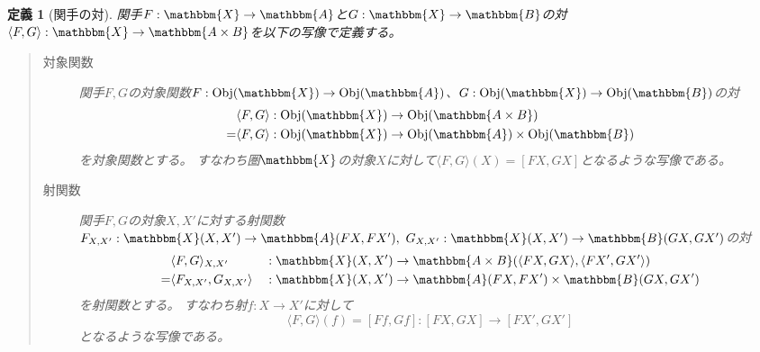 \documentclass[dvipdfmx]{jsarticle}
\newcommand{\cat}[1]{\mathbbm{#1}}
\newcommand{\arrow}{\rightarrow}
\newcommand{\functor}[3]{#1:\cat{#2}\arrow \cat{#3}}
\newcommand{\tuple}[1]{\langle #1\rangle}
\newcommand{\obj}[1]{\mathrm{Obj}(\cat{#1})}
\newcommand{\mor}[3]{#1:#2\arrow #3}
\newcommand{\arset}[3]{\cat{#1}(#2,#3)}
\newcommand{\pcobj}[1]{[#1]}
\newtheorem{define}{定義}[section]
\numberwithin{proof}{subsection}
\numberwithin{prop}{subsection}
\numberwithin{define}{subsection}
\begin{document}
	\begin{define}[関手の対]
		関手$\functor{F}{X}{A}$と$\functor{G}{X}{B}$の対$\functor{\tuple{F,G}}{X}{A\times B}$を以下の写像で定義する。
		\begin{quote}
			\begin{description}
				\item[対象関数] 関手$F,G$の対象関数$\mor{F}{\obj{X}}{\obj{A}}$、$\mor{G}{\obj{X}}{\obj{B}}$の対
				\begin{align*}
					&\mor{\tuple{F,G}}{\obj{X}}{\obj{A\times B}}\\
					=&\mor{\tuple{F,G}}{\obj{X}}{\obj{A}\times \obj{B}}
				\end{align*}
				を対象関数とする。
				すなわち圏$\cat{X}$の対象$X$に対して$\tuple{F,G}(X)=\pcobj{FX,GX}$となるような写像である。
				\item[射関数]
				関手$F,G$の対象$X,X'$に対する射関数$\mor{F_{X,X'}}{\arset{X}{X}{X'}}{\arset{A}{FX}{FX'}},\ \mor{G_{X,X'}}{\arset{X}{X}{X'}}{\arset{B}{GX}{GX'}}$の対
				\begin{align*}
					&\mor{\tuple{F,G}_{X,X'}&&}{\arset{X}{X}{X'}}{\arset{A\times B}{\tuple{FX,GX}}{\tuple{FX',GX'}}}\\
					=&	\mor{\tuple{F_{X,X'},G_{X,X'}}&&}{\arset{X}{X}{X'}}{\arset{A}{FX}{FX'}\times\arset{B}{GX}{GX'}}
				\end{align*}
				を射関数とする。
				すなわち射$\mor{f}{X}{X'}$に対して\[\mor{\tuple{F,G}(f)=\pcobj{Ff,Gf}}{\pcobj{FX,GX}}{\pcobj{FX',GX'}}\]となるような写像である。


\end{description}
\end{quote}
\end{define}
\end{document}

